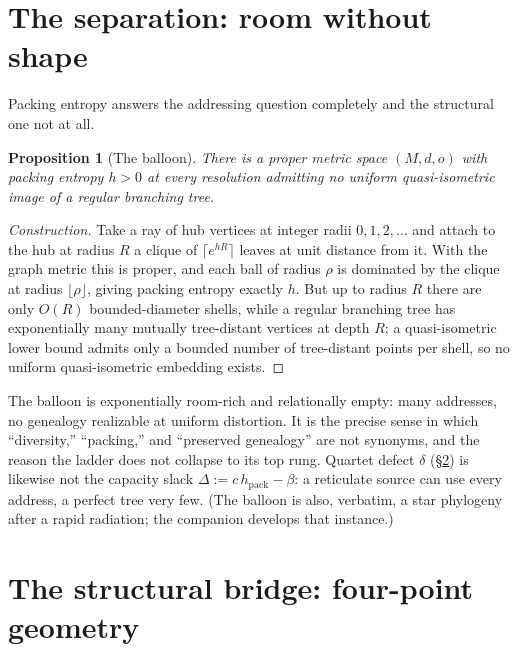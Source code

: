 \documentclass[11pt,reqno]{amsart}
\theoremstyle{plain}
\newtheorem{proposition}[theorem]{Proposition}
\theoremstyle{definition}
\newcommand{\hpack}{h_{\mathrm{pack}}}
\begin{document}
\section{The separation: room without shape}\label{sec:balloon}

Packing entropy answers the addressing question completely and the structural one not at all.

\begin{proposition}[The balloon]\label{prop:balloon}
There is a proper metric space $(M,d,o)$ with packing entropy $h>0$ at every resolution admitting no uniform quasi-isometric image of a regular branching tree.
\end{proposition}

\begin{proof}[Construction]
Take a ray of hub vertices at integer radii $0,1,2,\dots$ and attach to the hub at radius $R$ a clique of $\lceil e^{hR}\rceil$ leaves at unit distance from it. With the graph metric this is proper, and each ball of radius $\rho$ is dominated by the clique at radius $\lfloor\rho\rfloor$, giving packing entropy exactly $h$. But up to radius $R$ there are only $O(R)$ bounded-diameter shells, while a regular branching tree has exponentially many mutually tree-distant vertices at depth $R$; a quasi-isometric lower bound admits only a bounded number of tree-distant points per shell, so no uniform quasi-isometric embedding exists.
\end{proof}

The balloon is exponentially room-rich and relationally empty: many addresses, no genealogy realizable at uniform distortion. It is the precise sense in which ``diversity,'' ``packing,'' and ``preserved genealogy'' are not synonyms, and the reason the ladder does not collapse to its top rung. Quartet defect $\delta$ (\S\ref{sec:classifier}) is likewise not the capacity slack $\Delta:=c\,\hpack-\beta$: a reticulate source can use every address, a perfect tree very few. (The balloon is also, verbatim, a star phylogeny after a rapid radiation; the companion develops that instance.)

\section{The structural bridge: four-point geometry}\label{sec:classifier}
\end{document}
